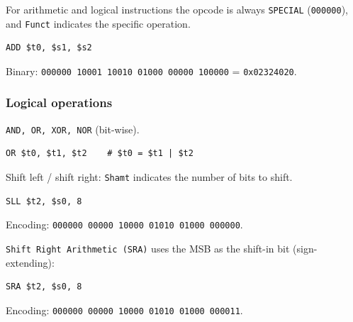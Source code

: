 For arithmetic and logical instructions the opcode is always
\texttt{SPECIAL} (\texttt{000000}), and \texttt{Funct} indicates the
specific operation.

\begin{eg}
\leavevmode
\begin{lstlisting}
ADD $t0, $s1, $s2
\end{lstlisting}
\begin{center}\begin{minipage}{\linewidth}\centering
{}
\end{minipage}
\end{center}
Binary: \texttt{000000 10001 10010 01000 00000 100000} \quad =\quad
\texttt{0x02324020}.
\end{eg}

\subsubsection{Logical operations}

\texttt{AND, OR, XOR, NOR} (bit-wise).
\begin{lstlisting}
OR $t0, $t1, $t2    # $t0 = $t1 | $t2
\end{lstlisting}
Shift left / shift right: \texttt{Shamt} indicates the number of bits to
shift.
\begin{eg}
\leavevmode
\begin{lstlisting}
SLL $t2, $s0, 8
\end{lstlisting}
Encoding: \texttt{000000 00000 10000 01010 01000 000000}.
\end{eg}

\texttt{Shift Right Arithmetic (SRA)} uses the MSB as the shift-in bit
(sign-extending):
\begin{eg}
\leavevmode
\begin{lstlisting}
SRA $t2, $s0, 8
\end{lstlisting}
Encoding: \texttt{000000 00000 10000 01010 01000 000011}.
\end{eg}

